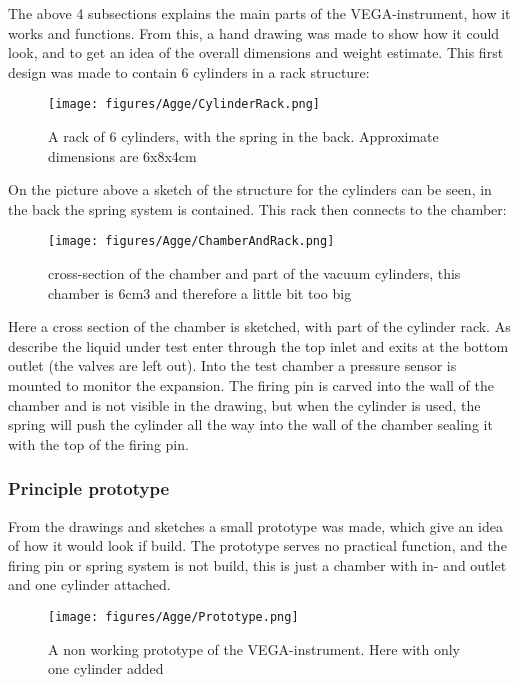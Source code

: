 \documentclass[10pt,a4paper,draft]{report}
\begin{document}
The above 4 subsections explains the main parts of the VEGA-instrument, how it works and functions. From this, a hand drawing was made to show how it could look, and to get an idea of the overall dimensions and weight estimate. This first design was made to contain 6 cylinders in a rack structure:\par

\begin{figure}[H]
\caption{A rack of 6 cylinders, with the spring in the back. Approximate dimensions are 6x8x4cm}
\centering
\texttt{[image: figures/Agge/CylinderRack.png]}     
\end{figure}

On the picture above a sketch of the structure for the cylinders can be seen, in the back the spring system is contained. This rack then connects to the chamber:\par

\begin{figure}[H]
\caption{cross-section of the chamber and part of the vacuum cylinders, this chamber is 6cm3 and therefore a little bit too big}
\centering
\texttt{[image: figures/Agge/ChamberAndRack.png]}      
\end{figure}

Here a cross section of the chamber is sketched, with part of the cylinder rack. As describe the liquid under test enter through the top inlet and exits at the bottom outlet (the valves are left out). Into the test chamber a pressure sensor is mounted to monitor the expansion. The firing pin is carved into the wall of the chamber and is not visible in the drawing, but when the cylinder is used, the spring will push the cylinder all the way into the wall of the chamber sealing it with the top of the firing pin.\par


\subsubsection{Principle prototype}
From the drawings and sketches a small prototype was made, which give an idea of how it would look if build. The prototype serves no practical function, and the firing pin or spring system is not build, this is just a chamber with in- and outlet and one cylinder attached.\par

\begin{figure}[H]
\caption{A non working prototype of the VEGA-instrument. Here with only one cylinder added}
\centering
\texttt{[image: figures/Agge/Prototype.png]}     
\end{figure}
\end{document}
